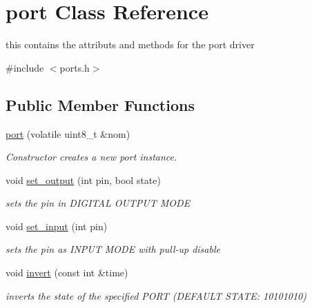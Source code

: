 \hypertarget{classport}{\section{port Class Reference}
\label{classport}
}


this contains the attributs and methods for the port driver  




{\ttfamily \#include $<$ports.\-h$>$}

\subsection*{Public Member Functions}
\begin{DoxyCompactItemize}
\item 
\hyperlink{classport_ac802d7443286c5e9e5b6b18e6d92b803}{port} (volatile uint8\-\_\-t \&nom)
\begin{DoxyCompactList}\small\item\em Constructor creates a new port instance. \end{DoxyCompactList}\item 
void \hyperlink{classport_ac7a0ac9d9d0c29ddcd6561830a1f848a}{set\-\_\-output} (int pin, bool state)
\begin{DoxyCompactList}\small\item\em sets the pin in D\-I\-G\-I\-T\-A\-L O\-U\-T\-P\-U\-T M\-O\-D\-E \end{DoxyCompactList}\item 
void \hyperlink{classport_a55687ade5fe370dcd855c7b8b6242ceb}{set\-\_\-input} (int pin)
\begin{DoxyCompactList}\small\item\em sets the pin as I\-N\-P\-U\-T M\-O\-D\-E with pull-\/up disable \end{DoxyCompactList}\item 
void \hyperlink{classport_aa0d4a6e02cc7610e5f50a9aa0e1654c2}{invert} (const int \&time)
\begin{DoxyCompactList}\small\item\em inverts the state of the specified P\-O\-R\-T (D\-E\-F\-A\-U\-L\-T S\-T\-A\-T\-E\-: 10101010) \end{DoxyCompactList}\end{DoxyCompactItemize}
